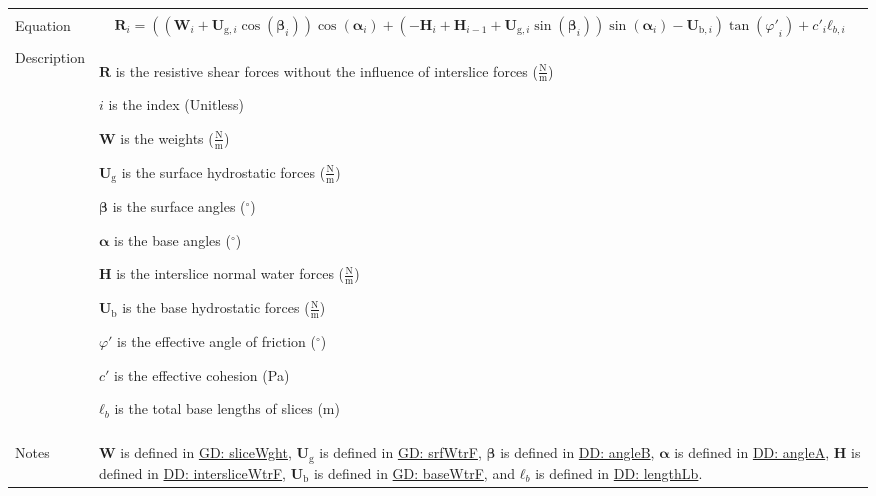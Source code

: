 \documentclass[12pt]{article}
\begin{document}
\begin{minipage}{\textwidth}
\begin{tabular}{>{\raggedright}p{}>{\raggedright\arraybackslash}p{}}
\\ \midrule \\
Equation & \begin{displaymath}
           {\mathbf{R}}_{i}=\left(\left({\mathbf{W}}_{i}+{\mathbf{U}_{\text{g},i}} \cos\left({\mathbf{β}}_{i}\right)\right) \cos\left({\mathbf{α}}_{i}\right)+\left(-{\mathbf{H}}_{i}+{\mathbf{H}}_{i-1}+{\mathbf{U}_{\text{g},i}} \sin\left({\mathbf{β}}_{i}\right)\right) \sin\left({\mathbf{α}}_{i}\right)-{\mathbf{U}_{\text{b},i}}\right) \tan\left({φ'}_{i}\right)+{c'}_{i} {\mathbf{ℓ}_{b,i}}
           \end{displaymath}
\\ \midrule \\
Description & \begin{symbDescription}
              \item{$\mathbf{R}$ is the resistive shear forces without the influence of interslice forces ($\frac{\text{N}}{\text{m}}$)}
              \item{$i$ is the index (Unitless)}
              \item{$\mathbf{W}$ is the weights ($\frac{\text{N}}{\text{m}}$)}
              \item{${\mathbf{U}_{\text{g}}}$ is the surface hydrostatic forces ($\frac{\text{N}}{\text{m}}$)}
              \item{$\mathbf{β}$ is the surface angles (${}^{\circ}$)}
              \item{$\mathbf{α}$ is the base angles (${}^{\circ}$)}
              \item{$\mathbf{H}$ is the interslice normal water forces ($\frac{\text{N}}{\text{m}}$)}
              \item{${\mathbf{U}_{\text{b}}}$ is the base hydrostatic forces ($\frac{\text{N}}{\text{m}}$)}
              \item{$φ'$ is the effective angle of friction (${}^{\circ}$)}
              \item{$c'$ is the effective cohesion (Pa)}
              \item{${\mathbf{ℓ}_{b}}$ is the total base lengths of slices (m)}
              \end{symbDescription}
\\ \midrule \\
Notes & $\mathbf{W}$ is defined in \hyperref[GD:sliceWght]{GD: sliceWght}, ${\mathbf{U}_{\text{g}}}$ is defined in \hyperref[GD:srfWtrF]{GD: srfWtrF}, $\mathbf{β}$ is defined in \hyperref[DD:angleB]{DD: angleB}, $\mathbf{α}$ is defined in \hyperref[DD:angleA]{DD: angleA}, $\mathbf{H}$ is defined in \hyperref[DD:intersliceWtrF]{DD: intersliceWtrF}, ${\mathbf{U}_{\text{b}}}$ is defined in \hyperref[GD:baseWtrF]{GD: baseWtrF}, and ${\mathbf{ℓ}_{b}}$ is defined in \hyperref[DD:lengthLb]{DD: lengthLb}.
        

\end{tabular}
\end{minipage}
\end{document}
